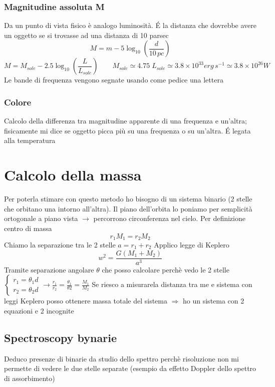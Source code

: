 \documentclass[a4paper,11pt]{report}
\theoremstyle{remark}
\theoremstyle{definition}
\begin{document}
\subsubsection*{Magnitudine assoluta M}
Da un punto di vista fisico è analogo luminosità. \'E la distanza che dovrebbe avere un oggetto se si trovasse ad una distanza di 10 parsec
\begin{equation*}
    M = m - 5\log_{10} \left(\frac{d}{10 \, pc}\right)
\end{equation*}
\begin{equation*}
    M = M_{sole} - 2.5 \log_{10}\left(\frac{L}{L_{sole}}\right) \qquad M_{sole} \simeq 4.75 \; L_{sole} \simeq 3.8 \times 10^{33} erg \, s^{-1} \simeq 3.8 \times 10^{26} W
\end{equation*}
Le bande di frequenza vengono segnate usando come pedice una lettera

\subsubsection*{Colore}
Calcolo della differenza tra magnitudine apparente di una frequenza e un'altra; fisicamente mi dice se oggetto picca più su una frequenza o su un'altra. \'E legata alla temperatura

\section*{Calcolo della massa}
Per poterla stimare con questo metodo ho bisogno di un sistema binario (2 stelle che orbitano una intorno all'altra). Il piano dell'orbita lo poniamo per semplicità ortogonale a piano vista $\rightarrow$ percorrono circonferenza nel cielo. \newline
Per definizione centro di massa
\begin{equation*}
    r_1M_1 = r_2M_2
\end{equation*}
Chiamo la separazione tra le 2 stelle $a = r_1+r_2$ \newline
Applico legge di Keplero
\begin{equation*}
    w^2 = \frac{G(M_1+M_2)}{a^3}
\end{equation*}
Tramite separazione angolare $\theta$ che posso calcolare perchè vedo le 2 stelle 
$\begin{cases*}
    r_1 = \theta_1 d \\
    r_2 = \theta_2 d
\end{cases*} 
\rightarrow \frac{r_1}{r_2} = \frac{\theta_1}{\theta2}= \frac{M_1}{M_2}$ \newline
Se riesco a misurarela distanza tra me e sistema con leggi Keplero posso ottenere massa totale del sistema $\Rightarrow$ ho un sistema con 2 equazioni e 2 incognite

\subsection*{Spectroscopy bynarie}
Deduco presenze di binarie da studio dello spettro perchè risoluzione non mi permette di vedere le due stelle separate (esempio da effetto Doppler dello spettro di assorbimento)
\end{document}
